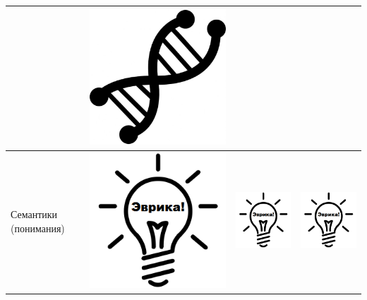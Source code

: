 \begin{frame}
\begin{center}
\begin{tabular}[c]{l|c|c|c|}
                        & \includegraphics[width=.12\textwidth]{fig/frog-code}
                            \\ \hline
            Семантики (понимания)
                & \includegraphics[width=.10\textwidth]{fig/eurika}
                    & \includegraphics[width=.10\textwidth]{fig/eurika}
                        & \includegraphics[width=.10\textwidth]{fig/eurika}
                            \\ \hline
        \end{tabular}
    \end{center}
    
\end{frame}


